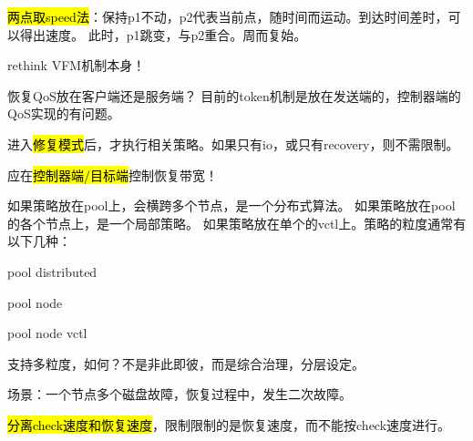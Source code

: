 \hl{两点取speed法}：保持p1不动，p2代表当前点，随时间而运动。到达时间差时，可以得出速度。
此时，p1跳变，与p2重合。周而复始。

rethink VFM机制本身！

恢复QoS放在客户端还是服务端？ 目前的token机制是放在发送端的，控制器端的QoS实现的有问题。

进入\hl{修复模式}后，才执行相关策略。如果只有io，或只有recovery，则不需限制。

应在\hl{控制器端/目标端}控制恢复带宽！

如果策略放在pool上，会横跨多个节点，是一个分布式算法。
如果策略放在pool的各个节点上，是一个局部策略。
如果策略放在单个的vctl上。策略的粒度通常有以下几种：
\begin{enumbox}
\item pool distributed
\item pool node
\item pool node vctl
\end{enumbox}

支持多粒度，如何？不是非此即彼，而是综合治理，分层设定。

场景：一个节点多个磁盘故障，恢复过程中，发生二次故障。

\hl{分离check速度和恢复速度}，限制限制的是恢复速度，而不能按check速度进行。

